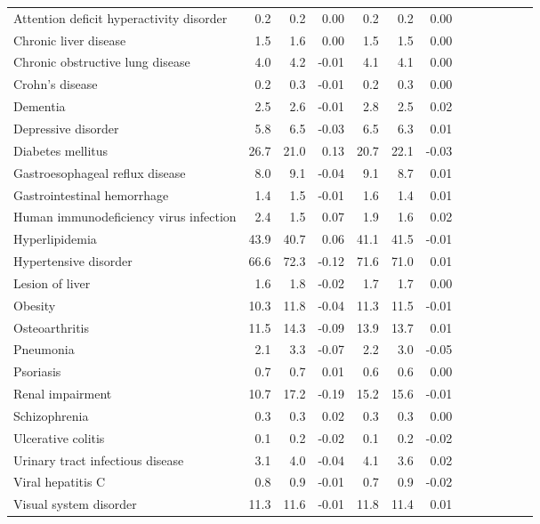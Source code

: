 \documentclass[11pt,]{article}
\begin{document}
\begin{longtable}{lrrrrrrrrrrrr}
      Attention deficit hyperactivity disorder &  0.2 &  0.2 &  0.00 &  0.2 &  0.2 &  0.00 \\ 
      Chronic liver disease &  1.5 &  1.6 &  0.00 &  1.5 &  1.5 &  0.00 \\ 
      Chronic obstructive lung disease &  4.0 &  4.2 & -0.01 &  4.1 &  4.1 &  0.00 \\ 
      Crohn's disease &  0.2 &  0.3 & -0.01 &  0.2 &  0.3 &  0.00 \\ 
      Dementia &  2.5 &  2.6 & -0.01 &  2.8 &  2.5 &  0.02 \\ 
      Depressive disorder &  5.8 &  6.5 & -0.03 &  6.5 &  6.3 &  0.01 \\ 
      Diabetes mellitus & 26.7 & 21.0 &  0.13 & 20.7 & 22.1 & -0.03 \\ 
      Gastroesophageal reflux disease &  8.0 &  9.1 & -0.04 &  9.1 &  8.7 &  0.01 \\ 
      Gastrointestinal hemorrhage &  1.4 &  1.5 & -0.01 &  1.6 &  1.4 &  0.01 \\ 
      Human immunodeficiency virus infection &  2.4 &  1.5 &  0.07 &  1.9 &  1.6 &  0.02 \\ 
      Hyperlipidemia & 43.9 & 40.7 &  0.06 & 41.1 & 41.5 & -0.01 \\ 
      Hypertensive disorder & 66.6 & 72.3 & -0.12 & 71.6 & 71.0 &  0.01 \\ 
      Lesion of liver &  1.6 &  1.8 & -0.02 &  1.7 &  1.7 &  0.00 \\ 
      Obesity & 10.3 & 11.8 & -0.04 & 11.3 & 11.5 & -0.01 \\ 
      Osteoarthritis & 11.5 & 14.3 & -0.09 & 13.9 & 13.7 &  0.01 \\ 
      Pneumonia &  2.1 &  3.3 & -0.07 &  2.2 &  3.0 & -0.05 \\ 
      Psoriasis &  0.7 &  0.7 &  0.01 &  0.6 &  0.6 &  0.00 \\ 
      Renal impairment & 10.7 & 17.2 & -0.19 & 15.2 & 15.6 & -0.01 \\ 
      Schizophrenia &  0.3 &  0.3 &  0.02 &  0.3 &  0.3 &  0.00 \\ 
      Ulcerative colitis &  0.1 &  0.2 & -0.02 &  0.1 &  0.2 & -0.02 \\ 
      Urinary tract infectious disease &  3.1 &  4.0 & -0.04 &  4.1 &  3.6 &  0.02 \\ 
      Viral hepatitis C &  0.8 &  0.9 & -0.01 &  0.7 &  0.9 & -0.02 \\ 
      Visual system disorder & 11.3 & 11.6 & -0.01 & 11.8 & 11.4 &  0.01 \\ 

\end{longtable}
\end{document}
